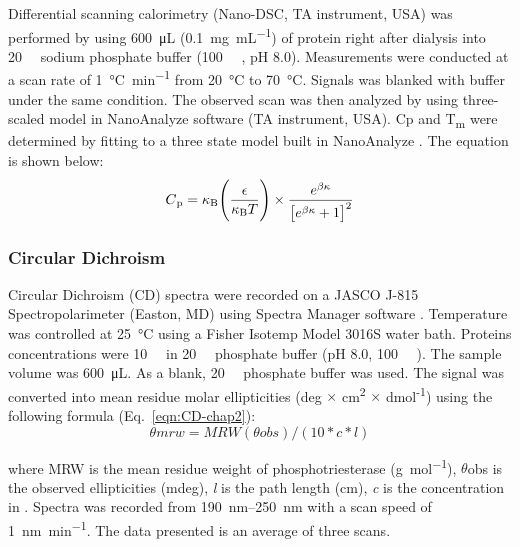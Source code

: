 \begin{refsection}
Differential scanning calorimetry (Nano-DSC, TA instrument, USA) was performed
by using \SI{600}{\micro\L} (\SI{0.1}{\mg\per\mL}) of protein right after
dialysis into \SI{20}{\milli\Molar} sodium phosphate buffer
(\SI{100}{\micro\Molar} , pH 8.0).  Measurements were conducted at a
scan rate of \SI{1}{\celsius\per\minute} from \SI{20}{\celsius} to
\SI{70}{\celsius}.  Signals was blanked with buffer under
the same condition.  The observed scan was then analyzed by using
three-scaled model in NanoAnalyze software (TA instrument, USA). Cp and
T\textsubscript{m} were determined by fitting to a three state model built in
NanoAnalyze \cite{Privalov1986}. The equation is shown below:
\begin{equation} 
    C\textsubscript{p} = \kappa\textsubscript{B}
    \Bigg(\frac{\epsilon}{\kappa\textsubscript{B}T}\Bigg) \times
    \frac{e^{\beta\kappa}}{\big[e^{\beta\kappa}+1\big]^{2}}
    \label{eqn:dsc-chap2}
\end{equation}

\subsubsection{Circular Dichroism}

Circular Dichroism (CD) spectra were recorded on a JASCO J-815 Spectropolarimeter
(Easton, MD) using Spectra Manager software \cite{Kataev1985}. Temperature was
controlled at \SI{25}{\celsius} using a Fisher Isotemp Model 3016S water bath.
Proteins concentrations were \SI{10}{\micro\Molar} in \SI{20}{\milli\Molar}
phosphate buffer (pH 8.0, \SI{100}{\micro\Molar} ). The sample volume
was \SI{600}{\micro\liter}. As a blank, \SI{20}{\milli\Molar} phosphate buffer
was used. The signal was converted into mean residue molar ellipticities (deg $\times$
cm\textsuperscript{2} $\times$ dmol\textsuperscript{-1}) using the following formula
\cite{Kelly2005} (Eq.~\ref{eqn:CD-chap2}): 
\begin{equation}
    θmrw = MRW(θobs) / (10 * c * l)
    \label{eqn:CD-chap2}
\end{equation}

where MRW is the mean residue weight of phosphotriesterase
(\si{\gram\per\mol}), $\theta$obs is the observed ellipticities (mdeg),
\emph{l} is the path length (cm), \emph{c} is the concentration in
\SI{}{\Molar}. Spectra was recorded from \SIrange{190}{250}{\nm} with a scan
speed of \SI{1}{\nano\meter\per\minute}.  The data presented is an average of
three scans.


\end{refsection}
